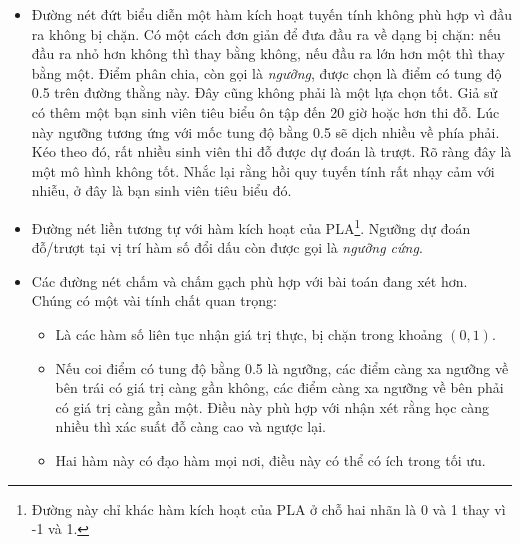 \begin{itemize}
\item Đường nét đứt biểu diễn một hàm kích hoạt tuyến tính không phù hợp vì
đầu ra không bị chặn. Có một cách đơn giản để đưa đầu ra về dạng bị chặn:
nếu đầu ra nhỏ hơn không thì thay bằng không, nếu đầu ra lớn hơn một thì
thay bằng một. Điểm phân chia, còn gọi là \textit{ngưỡng}, được chọn là điểm
có tung độ 0.5 trên đường thằng này. Đây cũng không phải là một lựa chọn
tốt. Giả sử có thêm một bạn {sinh viên tiêu biểu} ôn tập đến 20 giờ hoặc hơn
thi đỗ. Lúc này ngưỡng tương ứng với mốc tung độ bằng 0.5 sẽ dịch nhiều về phía
phải. Kéo theo đó, rất nhiều sinh viên thi đỗ được dự đoán là trượt. Rõ ràng
đây là một mô hình không tốt. Nhắc lại rằng hồi quy tuyến tính rất nhạy cảm
với nhiễu, ở đây là bạn {sinh viên tiêu biểu} đó.%

\item Đường nét liền tương tự với hàm kích hoạt của PLA\footnote{Đường này chỉ khác hàm kích hoạt của PLA ở chỗ hai nhãn là 0 và 1 thay vì -1 và 1.}. Ngưỡng dự đoán đỗ/trượt tại vị trí hàm số đổi dấu còn được gọi là \textit{ngưỡng cứng}.


\item Các đường nét chấm và chấm gạch phù hợp với bài toán đang xét hơn. Chúng có một vài tính chất quan trọng:
\begin{itemize}
\item Là các hàm số liên tục nhận giá trị thực, bị chặn trong khoảng $(0, 1)$.

\item Nếu coi điểm có tung độ bằng 0.5 là ngưỡng, các điểm
càng xa ngưỡng về bên trái có giá trị càng gần không, các
điểm càng xa ngưỡng về bên phải có giá trị càng gần một. Điều này
phù hợp với nhận xét rằng học càng nhiều thì xác suất đỗ càng cao
và ngược lại.

\item Hai hàm này có đạo hàm mọi nơi, điều này có thể có ích trong tối ưu.
\end{itemize}
\end{itemize}


